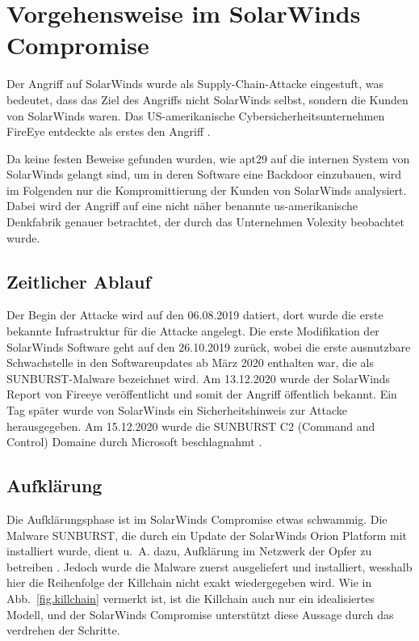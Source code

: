 \documentclass[conference]{IEEEtran}
\begin{document}
\section{Vorgehensweise im SolarWinds Compromise}

Der Angriff auf SolarWinds wurde als Supply-Chain-Attacke eingestuft, was bedeutet, dass das Ziel des Angriffs nicht SolarWinds selbst, sondern die Kunden von SolarWinds waren.
Das US-amerikanische Cybersicherheitsunternehmen FireEye entdeckte als erstes den Angriff \cite{9579611}.

Da keine festen Beweise gefunden wurden, wie \ac{apt}29 auf die internen System von SolarWinds gelangt sind, um in deren Software eine Backdoor einzubauen, wird im Folgenden nur die Kompromittierung der Kunden von SolarWinds analysiert.
Dabei wird der Angriff auf eine nicht näher benannte us-amerikanische Denkfabrik genauer betrachtet, der durch das Unternehmen Volexity beobachtet wurde.

\subsection{Zeitlicher Ablauf}
Der Begin der Attacke wird auf den 06.08.2019 datiert, dort wurde die erste bekannte Infrastruktur für die Attacke angelegt.
Die erste Modifikation der SolarWinds Software geht auf den 26.10.2019 zurück, wobei die erste ausnutzbare Schwachstelle in den Softwareupdates ab März 2020 enthalten war, die als SUNBURST-Malware bezeichnet wird.
Am 13.12.2020 wurde der SolarWinds Report von Fireeye veröffentlicht und somit der Angriff öffentlich bekannt.
Ein Tag später wurde von SolarWinds ein Sicherheitshinweis zur Attacke herausgegeben.
Am 15.12.2020 wurde die SUNBURST C2 (Command and Control) Domaine durch Microsoft beschlagnahmt \cite{Unit2020}.

\subsection{Aufklärung}
Die Aufklärungsphase ist im SolarWinds Compromise etwas schwammig.
Die Malware SUNBURST, die durch ein Update der SolarWinds Orion Platform mit installiert wurde, dient u.~A. dazu, Aufklärung im Netzwerk der Opfer zu betreiben \cite{Intelligence2020}.
Jedoch wurde die Malware zuerst ausgeliefert und installiert, wesshalb hier die Reihenfolge der Killchain nicht exakt wiedergegeben wird.
Wie in Abb.~\ref{fig.killchain} vermerkt ist, ist die Killchain auch nur ein idealisiertes Modell, und der SolarWinds Compromise unterstützt diese Aussage durch das verdrehen der Schritte.
\end{document}
